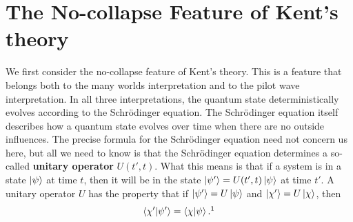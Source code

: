 \section{The No-collapse Feature of Kent's theory}
We first consider the no-collapse feature of Kent's theory. This is a feature that belongs both to the many worlds interpretation and to the pilot wave interpretation. In all three interpretations, the quantum state deterministically evolves according to the Schr\"{o}dinger equation. The Schr\"{o}dinger equation itself describes how a quantum state evolves over time when there are no outside influences. The precise formula for the Schr\"{o}dinger equation need not concern us here, but all we need to know is that the Schr\"{o}dinger equation determines a so-called \textbf{unitary operator} $U(t',t)$. What this means is that if a system is in a state $\ket{\psi}$ at time $t$, then it will be in the state $\ket{\psi'}=U(t',t)\ket{\psi}$
at time $t'$. A unitary operator $U$ has the property that if $\ket{\psi'}=U\ket{\psi}$ and $\ket{\chi'}=U\ket{\chi}$, then 
\begin{equation}\label{unitarycond}
\ip{\chi'}{\psi'}=\ip{\chi}{\psi}.\protect\footnotemark
\end{equation}
